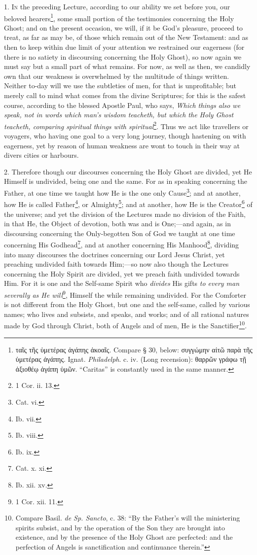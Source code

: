 1. \textsc{In} the preceding Lecture, according to our ability we set before you, our beloved hearers\footnote{\textgreek{ταῖς τῆς ὑμετέρας ἀγάπης ἀκοαῖς}. Compare § 30, below: \textgreek{συγγώμην αἰτῶ παρὰ τῆς ὑμετέρας ἀγάπης}. Ignat. \emph{Philadelph}. c. iv. (Long recension): \textgreek{θαρρῶν γράφω τῇ ἀξιοθέῳ ἀγάπη ὑμῶν}. “Caritas” is constantly used in the same manner.}, some small portion of the testimonies concerning the Holy Ghost; and on the present occasion, we will, if it be God’s pleasure, proceed to treat, as far as may be, of those which remain out of the New Testament: and as then to keep within due limit of your attention we restrained our eagerness (for there is no satiety in discoursing concerning the Holy Ghost), so now again we must say but a small part of what remains. For now, as well as then, we candidly own that our weakness is overwhelmed by the multitude of things written. Neither to-day will we use the subtleties of men, for that is unprofitable; but merely call to mind what comes from the divine Scriptures; for this is the safest course, according to the blessed Apostle Paul, who says, \emph{Which things also we speak, not in words which man’s wisdom teacheth, but which the Holy Ghost teacheth, comparing spiritual things with spiritual}\footnote{1 Cor. ii. 13.}. Thus we act like travellers or voyagers, who having one goal to a very long journey, though hastening on with eagerness, yet by reason of human weakness are wont to touch in their way at divers cities or harbours.

2. Therefore though our discourses concerning the Holy Ghost are divided, yet He Himself is undivided, being one and the same. For as in speaking concerning the Father, at one time we taught how He is the one only Cause\footnote{Cat. vi.}; and at another, how He is called Father\footnote{Ib. vii.}, or Almighty\footnote{Ib. viii.}; and at another, how He is the Creator\footnote{Ib. ix.} of the universe; and yet the division of the Lectures made no division of the Faith, in that He, the Object of devotion, both was and is One;—and again, as in discoursing concerning the Only-begotten Son of God we taught at one time concerning His Godhead\footnote{Cat. x. xi.}, and at another concerning His Manhood\footnote{Ib. xii. xv.}, dividing into many discourses the doctrines concerning our Lord Jesus Christ, yet preaching undivided faith towards Him;—so now also though the Lectures concerning the Holy Spirit are divided, yet we preach faith undivided towards Him. For it is one and the Self-same Spirit who \emph{divides} His gifts \emph{to every man severally as He will}\footnote{1 Cor. xii. 11.}, Himself the while remaining undivided. For the Comforter is not different from the Holy Ghost, but one and the self-same, called by various names; who lives and subsists, and speaks, and works; and of all rational natures made by God through Christ, both of Angels and of men, He is the Sanctifier\footnote{Compare Basil. \emph{de Sp. Sancto}, c. 38: “By the Father’s will the ministering spirits subsist, and by the operation of the Son they are brought into existence, and by the presence of the Holy Ghost are perfected: and the perfection of Angels is sanctification and continuance therein.”}.


